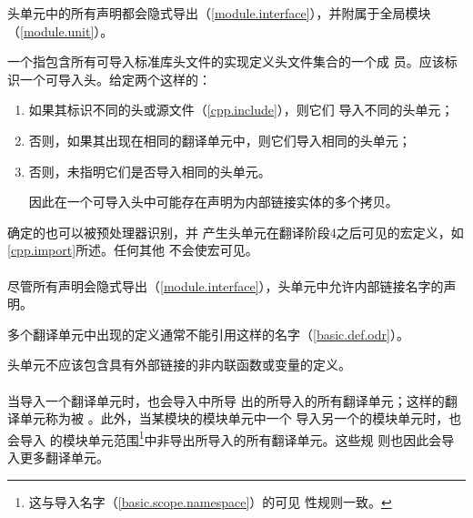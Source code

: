 \begin{note}
  头单元中的所有声明都会隐式导出（\ref{module.interface}），并附属于全局模块
  （\ref{module.unit}）。
\end{note}

一个指包含所有可导入\cpp{}标准库头文件的实现定义头文件集合的一个成
员。应该标识一个可导入头。给定两个这样的：
\begin{enumerate}
  \item 如果其标识不同的头或源文件（\ref{cpp.include}），则它们
    导入不同的头单元；
  \item 否则，如果其出现在相同的翻译单元中，则它们导入相同的头单元；
  \item 否则，未指明它们是否导入相同的头单元。
    \begin{note}
      因此在一个可导入头中可能存在声明为内部链接实体的多个拷贝。
    \end{note}
\end{enumerate}

\begin{note}
  确定的也可以被预处理器识别，并
  产生头单元在翻译阶段4之后可见的宏定义，如\ref{cpp.import}所述。任何其他
  不会使宏可见。
\end{note}

\paragraph{} %
尽管所有声明会隐式导出（\ref{module.interface}），头单元中允许内部链接名字的声
明。

\begin{note}
  多个翻译单元中出现的定义通常不能引用这样的名字（\ref{basic.def.odr}）。
\end{note}

头单元不应该包含具有外部链接的非内联函数或变量的定义。

\paragraph{} %
当导入一个翻译单元时，也会导入中所导
出的所导入的所有翻译单元；这样的翻译单元称为被
。此外，当某模块的模块单元中一个
导入另一个的模块单元时，也会导入
的模块单元范围\footnote{这与导入名字（\ref{basic.scope.namespace}）的可见
性规则一致。}中非导出所导入的所有翻译单元。这些规
则也因此会导入更多翻译单元。

